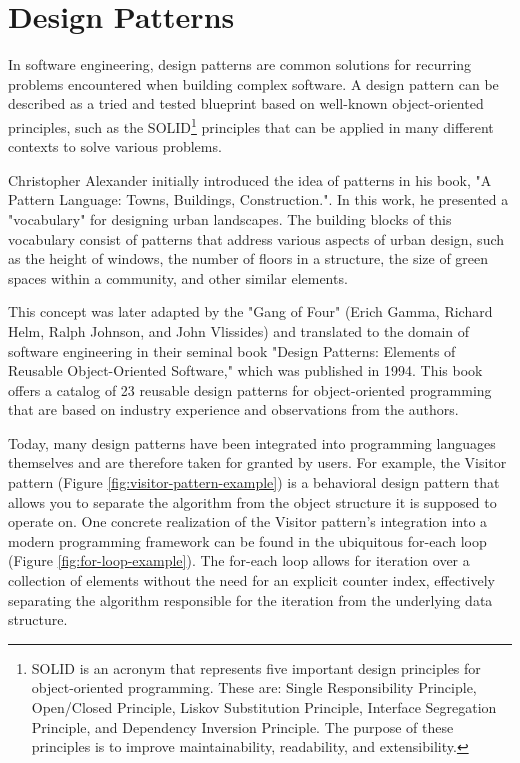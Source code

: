 \section{Design Patterns}
    In software engineering, design patterns are common solutions for recurring problems encountered when building complex software. A design pattern can be described as a tried and tested blueprint based on well-known object-oriented principles, such as the SOLID\footnote{SOLID is an acronym that represents five important design principles for object-oriented programming. These are: Single Responsibility Principle, Open/Closed Principle, Liskov Substitution Principle, Interface Segregation Principle, and Dependency Inversion Principle. The purpose of these principles is to improve maintainability, readability, and extensibility.} principles that can be applied in many different contexts to solve various problems.

    Christopher Alexander initially introduced the idea of patterns in his book, "A Pattern Language: Towns, Buildings, Construction.". In this work, he presented a "vocabulary" for designing urban landscapes. The building blocks of this vocabulary consist of patterns that address various aspects of urban design, such as the height of windows, the number of floors in a structure, the size of green spaces within a community, and other similar elements.

    This concept was later adapted by the "Gang of Four" (Erich Gamma, Richard Helm, Ralph Johnson, and John Vlissides) and translated to the domain of software engineering in their seminal book "Design Patterns: Elements of Reusable Object-Oriented Software," which was published in 1994. This book offers a catalog of 23 reusable design patterns for object-oriented programming that are based on industry experience and observations from the authors.

    Today, many design patterns have been integrated into programming languages themselves and are therefore taken for granted by users. For example, the Visitor pattern (Figure \ref{fig:visitor-pattern-example}) is a behavioral design pattern that allows you to separate the algorithm from the object structure it is supposed to operate on. One concrete realization of the Visitor pattern's integration into a modern programming framework can be found in the ubiquitous for-each loop (Figure \ref{fig:for-loop-example}). The for-each loop allows for iteration over a collection of elements without the need for an explicit counter index, effectively separating the algorithm responsible for the iteration from the underlying data structure.

